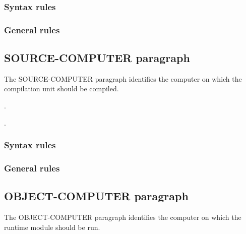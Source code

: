 \subsubsection{Syntax rules}

\subsubsection{General rules}

\subsection{SOURCE-COMPUTER paragraph}

The SOURCE-COMPUTER paragraph identifies the computer on which the compilation unit should be compiled.

\begin{syntax}
  .
  \begin{0-1}
    \begin{1=}
      \computername
    \end{1=}\gnucobol{\ldots}
    .
  \end{0-1}
\end{syntax}

\subsubsection{Syntax rules}

\subsubsection{General rules}

\subsection{OBJECT-COMPUTER paragraph}

The OBJECT-COMPUTER paragraph identifies the computer on which the runtime module should be run.

